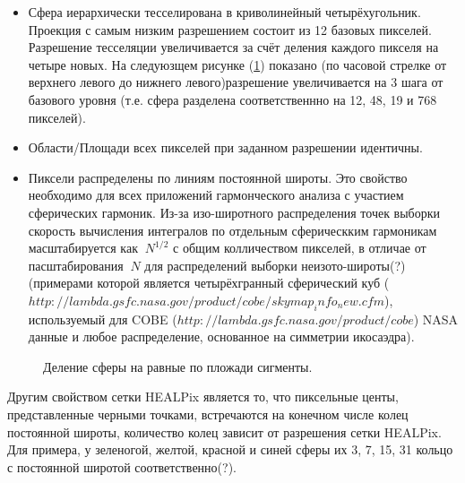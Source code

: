 \documentclass[14pt]{article} %
\begin{document}
\begin{itemize}
\item Сфера иерархически тесселирована в криволинейный четырёхугольник. Проекция с самым низким разрешением состоит из 12 базовых пикселей. Разрешение тесселяции увеличивается за счёт деления каждого пикселя на четыре новых. На следуюзщем рисунке (\ref{img:healpix}) показано (по часовой стрелке от верхнего левого до нижнего левого)разрешение увеличивается на 3 шага от базового уровня (т.е. сфера разделена соответственнно на 12, 48, 19 и 768 пикселей).
\item Области/Площади всех пикселей при заданном разрешении идентичны.
\item Пиксели распределены по линиям постоянной широты. Это свойство необходимо для всех приложений гармонческого анализа с участием сферических гармоник. Из-за изо-широтного распределения точек выборки скорость вычисления интегралов по отдельным сферическким гармоникам масштабируется как $~N^{1/2}$ с общим колличеством пикселей, в отличае от пасштабирования $~N$ для распределений выборки неизото-широты(?) (примерами которой является четырёхгранный сферический куб ($http://lambda.gsfc.nasa.gov/product/cobe/skymap_info_new.cfm$), используемый для COBE ($http://lambda.gsfc.nasa.gov/product/cobe$) NASA данные и любое распределение, основанное на симметрии икосаэдра).
\end{itemize}

\begin{figure}[h!]
\caption{Деление сферы на равные по пложади сигменты.}
\label{img:healpix}
\end{figure}

Другим свойством сетки HEALPix является то, что пиксельные центы, представленные черными точками, встречаются на конечном числе колец постоянной широты, количество колец зависит от разрешения сетки HEALPix. Для примера, у зеленогой, желтой, красной и синей сферы их 3, 7, 15, 31 кольцо с постоянной широтой соответственно(?).
\end{document}
